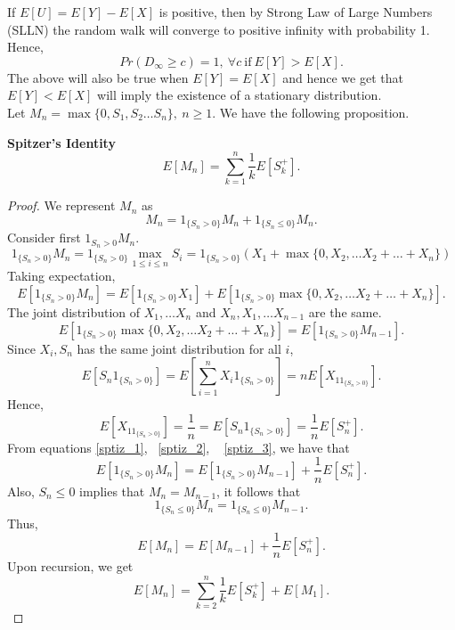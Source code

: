 \documentclass[a4paper,10pt,english]{article}
\begin{document}
If $E[U]=E[Y]-E[X]$ is positive, then by Strong Law of Large Numbers (SLLN) the random walk will converge to positive infinity with probability 1. Hence,
\begin{equation*}
Pr(D_{\infty} \geq c) =1,~ \forall c ~\text{if}~ E[Y]>E[X].
\end{equation*}
The above will also be true when $E[Y]=E[X]$ and hence we get that $E[Y]< E[X]$ will imply the existence of a stationary distribution.\\
Let $M_n=\max\{0,S_1,S_2 \hdots S_n\},~ n \geq 1$. We have the following proposition.
\begin{prop}
\textbf{Spitzer's Identity}
\begin{equation*}
E[M_n]= \sum_{k=1}^{n} \frac{1}{k} E[S_k^+].
\end{equation*}
\end{prop}
\begin{proof}
We represent $M_n$ as 
\begin{equation*}
M_n=1_{\{S_n>0\}}M_n+1_{\{S_n \leq 0\}}M_n.
\end{equation*}
Consider first $1_{S_n>0}M_n$.
\begin{equation*}
1_{\{S_n>0\}}M_n= 1_{\{S_n>0\}}\max_{1\leq i \leq n}S_i = 1_{\{S_n>0\}}(X_1+\max\{0,X_2,\hdots X_2+\hdots +X_n\})
\end{equation*}
Taking expectation,
\begin{equation}
\label{sptiz_1}
E[1_{\{S_n>0\}}M_n]= E [ 1_{\{S_n>0\}} X_1 ]+ E[ 1_{\{S_n>0\}} \max\{0,X_2,\hdots X_2+\hdots +X_n\}].
\end{equation}
The joint distribution of $X_1, \hdots X_n$ and $X_n,X_1, \hdots X_{n-1}$ are the same. 
\begin{equation}
\label{sptiz_2}
 E[ 1_{\{S_n>0\}} \max\{0,X_2,\hdots X_2+\hdots +X_n\}]=E[1_{\{S_n >0\}}M_{n-1}].
\end{equation}
Since $X_i,S_n$ has the same joint distribution for all $i$,
\begin{equation*}
E[S_n1_{\{S_n>0\}}]=E[\sum_{i=1}^{n}X_i 1_{\{S_n>0\}}]=nE[X_11_{\{S_n>0\}}].
\end{equation*}
Hence,
\begin{equation}
\label{sptiz_3}
 E[X_11_{\{S_n>0\}}]=\frac{1}{n}=E[S_n 1_{\{S_n>0\}}] =\frac{1}{n}E[S_n^+].
\end{equation}
From equations \ref{sptiz_1}, ~\ref{sptiz_2}, ~ \ref{sptiz_3}, we have that
\begin{equation*}
E[1_{\{S_n>0\}}M_n]=E[1_{\{S_n>0\}}M_{n-1}]+\frac{1}{n}E[S_n^+].
\end{equation*}
Also, $S_n \leq 0$ implies that $M_n=M_{n-1}$, it follows that
\begin{equation*}
1_{\{S_n\leq 0\}}M_n=1_{\{S_n\leq 0\}}M_{n-1}.
\end{equation*}
Thus,
\begin{equation*}
E[M_n]=E[M_{n-1}]+\frac{1}{n}E[S_n^+].
\end{equation*}
Upon recursion, we get
 \begin{equation*}
E[M_n]= \sum_{k=2}^{n} \frac{1}{k} E[S_k^+]+E[M_1].
\end{equation*}
\end{proof}
\end{document}
